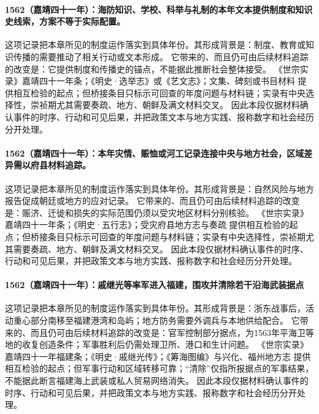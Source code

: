 \paragraph{1562（嘉靖四十一年）：海防知识、学校、科举与礼制的本年文本提供制度和知识史线索，方案不等于实际配置。} 这项记录把本章所见的制度运作落实到具体年份。其形成背景是：制度、教育或知识传播的需要推动了相关行动或文本形成。 它带来的、而且仍可由后续材料追踪的改变是：它提供制度和传播史的锚点，不能据此推断社会整体接受。 《世宗实录》嘉靖四十一年条；《明史·选举志》或《艺文志》；文集、碑刻或书目材料 提供相互检验的起点；但桥接条目只标示可回查的年度问题与材料链；实录有中央选择性，崇祯期尤其需要奏疏、地方、朝鲜及满文材料交叉。 因此本段仅据材料确认事件的时序、行动和可见后果，并把政策文本与地方实践、报称数字和社会经历分开处理。

\paragraph{1562（嘉靖四十一年）：本年灾情、赈恤或河工记录连接中央与地方社会，区域差异需以府县材料追踪。} 这项记录把本章所见的制度运作落实到具体年份。其形成背景是：自然风险与地方报告促成朝廷或地方的应对记录。 它带来的、而且仍可由后续材料追踪的改变是：赈济、迁徙和损失的实际范围仍须以受灾地区材料分别核验。 《世宗实录》嘉靖四十一年条；《明史·五行志》；受灾府县地方志与奏疏 提供相互检验的起点；但桥接条目只标示可回查的年度问题与材料链；实录有中央选择性，崇祯期尤其需要奏疏、地方、朝鲜及满文材料交叉。 因此本段仅据材料确认事件的时序、行动和可见后果，并把政策文本与地方实践、报称数字和社会经历分开处理。

\paragraph{1562（嘉靖四十一年）：戚继光等率军进入福建，围攻并清除若干沿海武装据点} 这项记录把本章所见的制度运作落实到具体年份。其形成背景是：浙东战事后，活动重心部分南移至福建港湾和岛屿；地方防务需要外调兵与本地供给配合。 它带来的、而且仍可由后续材料追踪的改变是：官军控制部分据点，为1563年平海卫等地的收复创造条件；军事胜利后仍需处理卫所、港口和生计问题。 《世宗实录》嘉靖四十一年福建条；《明史·戚继光传》；《筹海图编》与兴化、福州地方志 提供相互检验的起点；但军事行动和区域转移可靠；“清除”仅指所报据点的军事结果，不能据此断言福建海上武装或私人贸易网络消失。 因此本段仅据材料确认事件的时序、行动和可见后果，并把政策文本与地方实践、报称数字和社会经历分开处理。

